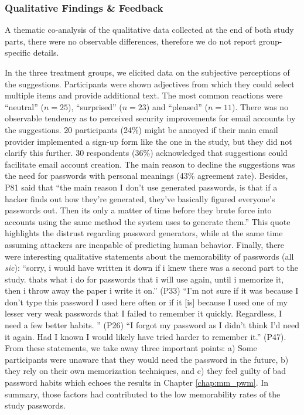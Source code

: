 \subsubsection{Qualitative Findings \& Feedback}
A thematic co-analysis of the qualitative data collected at the end of both study parts, there were no observable differences, therefore we do not report group-specific details.  %

In the three treatment groups, we elicited data on the subjective perceptions of the suggestions. Participants were shown adjectives from which they could select multiple items and provide additional text. The most common reactions were ``neutral'' ($n=25$), ``surprised'' ($n=23$) and ``pleased'' ($n=11$). There was no observable tendency as to perceived security improvements for email accounts by the suggestions. 20 participants (24\%) might be annoyed if their main email provider implemented a sign-up form like the one in the study, but they did not clarify this further. 30 respondents (36\%) acknowledged that suggestions could facilitate email account creation. The main reason to decline the suggestions was the need for passwords with personal meanings (43\% agreement rate). 
Besides, P81 said that ``the main reason I don't use generated passwords, is that if a hacker finds out how they're generated, they've basically figured everyone's passwords out. Then its only a matter of time before they brute force into accounts using the same method the system uses to generate them.'' This quote highlights the distrust regarding password generators, while at the same time assuming attackers are incapable of predicting human behavior.
Finally, there were interesting qualitative statements about the memorability of passwords (all \textit{sic}): ``sorry, i would have written it down if i knew there was a second part to the study. thats what i do for passwords that i will use again, until i memorize it, then i throw away the paper i write it on.'' (P33) ``I'm not sure if it was because I don't type this password I used here often or if it [is] because I used one of my lesser very weak passwords that I failed to remember it quickly. Regardless, I need a few better habits. '' (P26) ``I forgot my password as I didn't think I'd need it again. Had I known I would likely have tried harder to remember it.'' (P47). From these statements, we take away three important points: a) Some participants were unaware that they would need the password in the future, b) they rely on their own memorization techniques, and c) they feel guilty of bad password habits which echoes the results in Chapter \ref{chap:mm_pwm}. In summary, those factors had contributed to the low memorability rates of the study passwords. 

